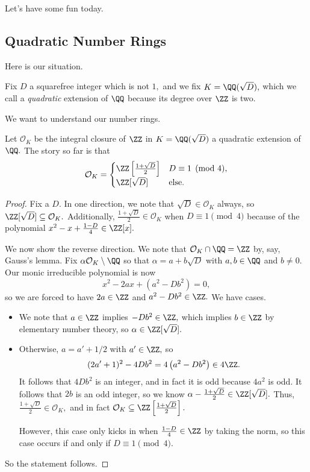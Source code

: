 








Let's have some fun today.

\subsection{Quadratic Number Rings}
Here is our situation.
\begin{defi}
    Fix $D$ a squarefree integer which is not $1,$ and we fix $K=\QQ(\sqrt D),$ which we call a \textit{quadratic} extension of $\QQ$ because its degree over $\ZZ$ is two.
\end{defi}
We want to understand our number rings.
\begin{prop}
    Let $\mathcal O_K$ be the integral closure of $\ZZ$ in $K=\QQ(\sqrt D)$ a quadratic extension of $\QQ.$ The story so far is that
    \[\mathcal O_K=\begin{cases}
        \ZZ\left[\frac{1+\sqrt D}2\right] & D\equiv1\pmod4, \\
        \ZZ[\sqrt D] & \text{else}.
    \end{cases}\]
\end{prop}
\begin{proof}
    Fix a $D.$ In one direction, we note that $\sqrt D\in\mathcal O_K$ always, so $\ZZ[\sqrt D]\subseteq\mathcal O_K.$ Additionally, $\frac{1+\sqrt D}2\in\mathcal O_K$ when $D\equiv1\pmod4$ because of the polynomial $x^2-x+\frac{1-D}4\in\ZZ[x].$
    
    We now show the reverse direction. We note that $\mathcal O_K\cap\QQ=\ZZ$ by, say, Gauss's lemma. Fix $\alpha\mathcal O_K\setminus\QQ$ so that $\alpha=a+b\sqrt D$ with $a,b\in\QQ$ and $b\ne0.$ Our monic irreducible polynomial is now
    \[x^2-2ax+\left(a^2-Db^2\right)=0,\]
    \todo{}so we are forced to have $2a\in\ZZ$ and $a^2-Db^2\in\ZZ.$ We have cases.
    \begin{itemize}
        \item We note that $a\in\ZZ$ implies $-Db^2\in\ZZ,$ which implies $b\in\ZZ$ by elementary number theory, so $\alpha\in\ZZ[\sqrt D].$
        \item Otherwise, $a=a'+1/2$ with $a'\in\ZZ,$ so
        \[(2a'+1)^2-4Db^2=4\left(a^2-Db^2\right)\in4\ZZ.\]
        It follows that $4Db^2$ is an integer, and in fact it is odd because $4a^2$ is odd. It follows that $2b$ is an odd integer, so we know $\alpha-\frac{1+\sqrt D}2\in\ZZ[\sqrt D].$ Thus, $\frac{1+\sqrt D}2\in\mathcal O_K,$ and in fact $\mathcal O_K\subseteq\ZZ\left[\frac{1+\sqrt D}2\right].$
        
        However, this case only kicks in when $\frac{1-D}4\in\ZZ$ by taking the norm, so this case occurs if and only if $D\equiv1\pmod4.$
    \end{itemize}
    So the statement follows.
\end{proof}

